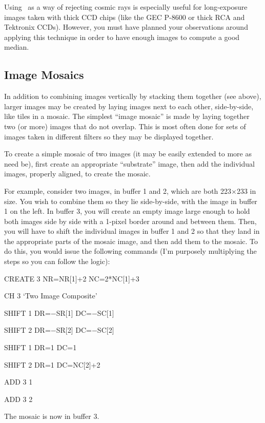 Using \ as a way of rejecting cosmic rays is especially useful
for long-exposure images taken with thick CCD chips (like the GEC P-8600 or
thick RCA and Tektronix CCDs).  However, you must have planned your
observations around applying this technique in order to have enough images to
compute a good median. 

\subsection{Image Mosaics}
\label{sec:immosaic}
In addition to combining images vertically by stacking them together (see
above), larger images may be created by laying images next to each other,
side-by-side, like tiles in a mosaic.  The simplest ``image mosaic'' is made
by laying together two (or more) images that do not overlap.  This is most
often done for sets of images taken in different filters so they may be
displayed together. 

To create a simple mosaic of two images (it may be easily extended to
more as need be), first create an appropriate ``substrate'' image, then
add the individual images, properly aligned, to create the mosaic.

For example, consider two images, in buffer 1 and 2, which are both
223$\times$233 in size.  You wish to combine them so they lie side-by-side,
with the image in buffer 1 on the left.  In buffer 3, you will create an empty
image large enough to hold both images side by side with a 1-pixel border
around and between them.  Then, you will have to shift the individual images
in buffer 1 and 2 so that they land in the appropriate parts of the mosaic
image, and then add them to the mosaic. To do this, you would issue the
following commands (I'm purposely multiplying the steps so you can follow the
logic): 
\begin{command}
      \item CREATE 3 NR=NR[1]+2 NC=2*NC[1]+3
      \item CH 3 `Two Image Composite'
      \item SHIFT 1 DR=$-$SR[1] DC=$-$SC[1]
      \item SHIFT 2 DR=$-$SR[2] DC=$-$SC[2]
      \item SHIFT 1 DR=1 DC=1
      \item SHIFT 2 DR=1 DC=NC[2]+2
      \item ADD 3 1
      \item ADD 3 2
\end{command}
The mosaic is now in buffer 3.

